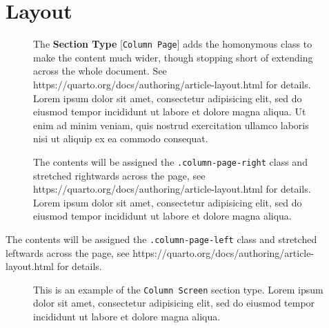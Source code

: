 \documentclass[
  12pt,
  a4paper,
  oneside,
  numbers=noenddot,
  titlepage,
  toclink=all,
  toc=bibliography]{scrbook}
\theoremstyle{definition}
\theoremstyle{definition}
\theoremstyle{definition}
\theoremstyle{plain}
\theoremstyle{plain}
\theoremstyle{plain}
\theoremstyle{plain}
\theoremstyle{plain}
\theoremstyle{remark}
\begin{document}
\hypertarget{sec-scriv59}{%
\section{Layout}\label{sec-scriv59}}

\hypertarget{scriv60}{}
\begin{figure}

The \textbf{Section Type }{[}\texttt{Column\ Page}{]} adds the
homonymous class to make the content much wider, though stopping short
of extending across the whole document. See
https://quarto.org/docs/authoring/article-layout.html for details. Lorem
ipsum dolor sit amet, consectetur adipisicing elit, sed do eiusmod
tempor incididunt ut labore et dolore magna aliqua. Ut enim ad minim
veniam, quis nostrud exercitation ullamco laboris nisi ut aliquip ex ea
commodo consequat.

\end{figure}

\hypertarget{scriv61}{}
\begin{figure}

The contents will be assigned the \texttt{.column-page-right} class and
stretched rightwards across the page, see
https://quarto.org/docs/authoring/article-layout.html for details. Lorem
ipsum dolor sit amet, consectetur adipisicing elit, sed do eiusmod
tempor incididunt ut labore et dolore magna aliqua.

\end{figure}

\leavevmode{}%
The contents will be assigned the \texttt{.column-page-left} class and
stretched leftwards across the page, see
https://quarto.org/docs/authoring/article-layout.html for details.

\hypertarget{scriv63}{}
\begin{figure}

This is an example of the \texttt{Column\ Screen} section type. Lorem
ipsum dolor sit amet, consectetur adipisicing elit, sed do eiusmod
tempor incididunt ut labore et dolore magna aliqua.

\end{figure}

\hypertarget{scriv64}{}
\end{document}
